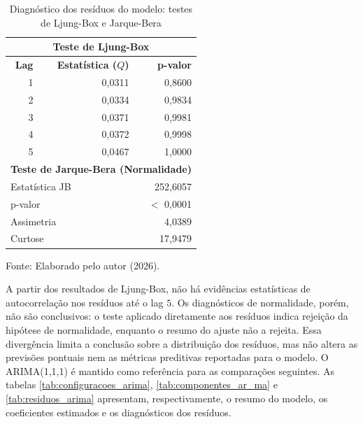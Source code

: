 \begin{table}[htbp]
	\centering
	\captionsetup{justification=centering}
	\caption{Diagnóstico dos resíduos do modelo: testes de Ljung-Box e Jarque-Bera}
	\label{tab:diagnostico_residuos}
	\begin{tabular}{rrr}
		\toprule
		\multicolumn{3}{c}{\textbf{Teste de Ljung-Box}} \\
		\midrule
		\textbf{Lag} & \textbf{Estatística ($Q$)} & \textbf{p-valor} \\
		\midrule
		1 & 0,0311 & 0,8600 \\
		2 & 0,0334 & 0,9834 \\
		3 & 0,0371 & 0,9981 \\
		4 & 0,0372 & 0,9998 \\
		5 & 0,0467 & 1,0000 \\
		\midrule
		\multicolumn{3}{c}{\textbf{Teste de Jarque-Bera (Normalidade)}} \\
		\midrule
		\multicolumn{2}{l}{Estatística JB} & 252,6057 \\
		\multicolumn{2}{l}{p-valor} & $<$ 0,0001 \\
		\multicolumn{2}{l}{Assimetria} & 4,0389 \\
		\multicolumn{2}{l}{Curtose} & 17,9479 \\
		\bottomrule
	\end{tabular}
	
	\vspace{0.1cm}
	
	\centering
	\small Fonte: Elaborado pelo autor (2026).
\end{table}

%

A partir dos resultados de Ljung-Box, não há evidências estatísticas de autocorrelação nos resíduos até o lag $5$. Os diagnósticos de normalidade, porém, não são conclusivos: o teste aplicado diretamente aos resíduos indica rejeição da hipótese de normalidade, enquanto o resumo do ajuste não a rejeita. Essa divergência limita a conclusão sobre a distribuição dos resíduos, mas não altera as previsões pontuais nem as métricas preditivas reportadas para o modelo. O ARIMA(1,1,1) é mantido como referência para as comparações seguintes. As tabelas \ref{tab:configuracoes_arima}, \ref{tab:componentes_ar_ma} e \ref{tab:residuos_arima} apresentam, respectivamente, o resumo do modelo, os coeficientes estimados e os diagnósticos dos resíduos.



